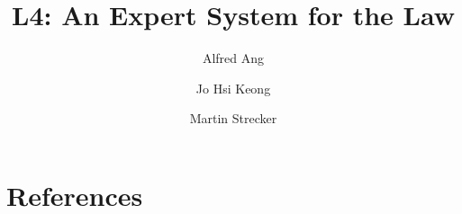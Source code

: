 \documentclass[review]{elsarticle}
\begin{document}
\begin{frontmatter}

\title{L4: An Expert System for the Law}
\author{Alfred Ang}
\author{Jo Hsi Keong}
\author{Martin Strecker} 
\address{Centre for Computational Law, Singapore Management University}



\begin{keyword}

\end{keyword}

\end{frontmatter}

\linenumbers
















\section*{References}


\end{document}
